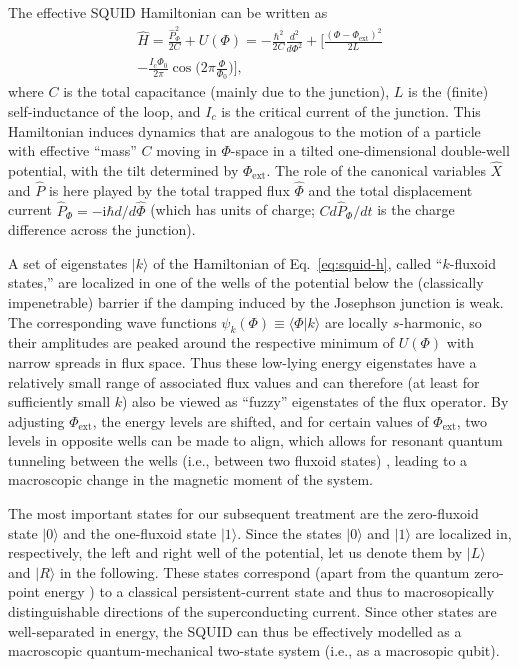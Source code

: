 \documentclass[twocolumn,aps,floatfix,amsmath,amssymb,showpacs,nofootinbib]{revtex4}
\newcommand{\ket}[1]{\ensuremath{|{#1\rangle}}}
\newcommand{\braket}[2]{\ensuremath{{\langle #1}|{#2 \rangle}}}
\begin{document}
The effective SQUID Hamiltonian can be written as \cite{Weiss:1999:tv}
%
\begin{multline} \label{eq:squid-h}
\widehat{H} = \frac{\widehat{P}_\Phi^2}{2C} + U(\Phi) 
= - \frac{\hbar^2}{2C}
 \frac{d^2}{d\Phi^2} + \biggl[ \frac{(\Phi- 
  \Phi_\text{ext})^2}{2L} \\ - \frac{I_c \Phi_0}{2\pi} \cos \biggl(
2\pi \frac{\Phi}{\Phi_0} \biggr) \biggr],
\end{multline}
%
where $C$ is the total capacitance (mainly due to the junction), $L$
is the (finite) self-inductance of the loop, and $I_c$ is the critical
current of the junction. This Hamiltonian induces dynamics that are
analogous to the motion of a particle with effective ``mass'' $C$
moving in $\Phi$-space in a tilted one-dimensional double-well
potential, with the tilt determined by $\Phi_\text{ext}$. The role of
the canonical variables $\widehat{X}$ and $\widehat{P}$ is here played
by the total trapped flux $\widehat{\Phi}$ and the total displacement
current $\widehat{P}_\Phi = -\mathrm{i}\hbar d/d\widehat{\Phi}$ (which has
units of charge; $Cd\widehat{P}_\Phi / dt$ is the charge difference
across the junction).

A set of eigenstates $\ket{k}$ of the Hamiltonian of
Eq.~\eqref{eq:squid-h}, called ``$k$-fluxoid states,'' are localized
in one of the wells of the potential below the (classically
impenetrable) barrier if the damping induced by the Josephson junction
is weak. The corresponding wave functions $\psi_k(\Phi) \equiv
\braket{\Phi}{k}$ are locally $s$-harmonic, so their amplitudes are
peaked around the respective minimum of $U(\Phi)$ with narrow spreads
in flux space. Thus these low-lying energy eigenstates have a
relatively small range of associated flux values and can therefore (at
least for sufficiently small $k$) also be viewed as ``fuzzy''
eigenstates of the flux operator. By adjusting $\Phi_\text{ext}$, the
energy levels are shifted, and for certain values of
$\Phi_\text{ext}$, two levels in opposite wells can be made to align,
which allows for resonant quantum tunneling between the wells (i.e.,
between two fluxoid states) \cite{Silvestrini:1996:ii,Rouse:1998:om},
leading to a macroscopic change in the magnetic moment of the system.

The most important states for our subsequent treatment are the
zero-fluxoid state $\ket{0}$ and the one-fluxoid state $\ket{1}$.
Since the states $\ket{0}$ and $\ket{1}$ are localized in,
respectively, the left and right well of the potential, let us denote
them by $\ket{L}$ and $\ket{R}$ in the following. These states
correspond (apart from the quantum zero-point energy
\cite{Wal:2000:om}) to a classical persistent-current state and thus
to macrosopically distinguishable directions of the superconducting
current.  Since other states are well-separated in energy, the SQUID
can thus be effectively modelled as a macroscopic quantum-mechanical
two-state system (i.e., as a macrosopic qubit).
\end{document}
